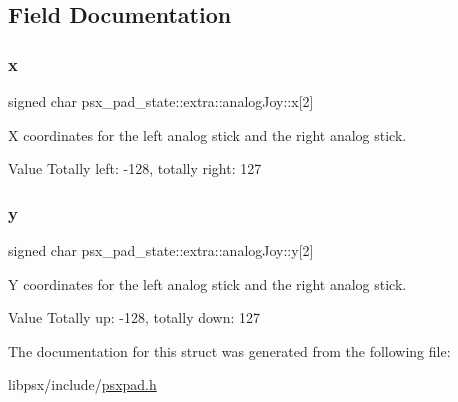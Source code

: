\subsection{Field Documentation}
\mbox{\label{structpsx__pad__state_1_1extra_1_1analogJoy_a7c91cf5c544d6224f03ce744b91f04d7}} 
\subsubsection{\texorpdfstring{x}{x}}
{\footnotesize\ttfamily signed char psx\+\_\+pad\+\_\+state\+::extra\+::analog\+Joy\+::x\mbox{[}2\mbox{]}}



X coordinates for the left analog stick and the right analog stick. 

\begin{DoxyParagraph}{Value }
Totally left\+: -\/128, totally right\+: 127 
\end{DoxyParagraph}
\mbox{\label{structpsx__pad__state_1_1extra_1_1analogJoy_abbdd8d074005a21dde9bd8f0765f4710}} 
\subsubsection{\texorpdfstring{y}{y}}
{\footnotesize\ttfamily signed char psx\+\_\+pad\+\_\+state\+::extra\+::analog\+Joy\+::y\mbox{[}2\mbox{]}}



Y coordinates for the left analog stick and the right analog stick. 

\begin{DoxyParagraph}{Value }
Totally up\+: -\/128, totally down\+: 127 
\end{DoxyParagraph}


The documentation for this struct was generated from the following file\+:\begin{DoxyCompactItemize}
\item 
libpsx/include/\hyperlink{psxpad_8h}{psxpad.\+h}\end{DoxyCompactItemize}

